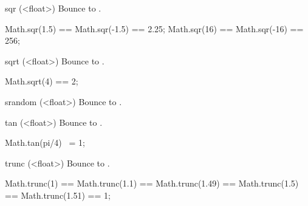 \begin{urbiscriptapi}
\item[sqr](<float>)%
  Bounce to .
\begin{urbiassert}
Math.sqr(1.5) == Math.sqr(-1.5) == 2.25;
Math.sqr(16)  == Math.sqr(-16)  == 256;
\end{urbiassert}

\item[sqrt](<float>)%
  Bounce to .
\begin{urbiassert}
Math.sqrt(4) == 2;
\end{urbiassert}

\item[srandom](<float>)%
  Bounce to .

\item[tan](<float>)%
  Bounce to .
\begin{urbiassert}
Math.tan(pi/4) ~= 1;
\end{urbiassert}

\item[trunc](<float>)%
  Bounce to .
\begin{urbiassert}
Math.trunc(1) == Math.trunc(1.1) == Math.trunc(1.49) == Math.trunc(1.5)
  == Math.trunc(1.51)
  == 1;
\end{urbiassert}
\end{urbiscriptapi}



